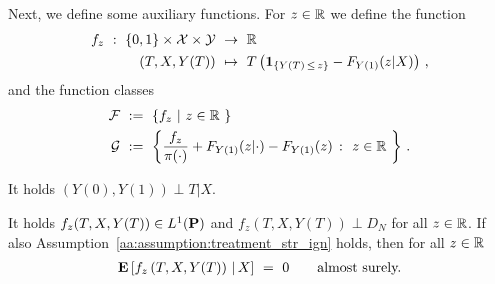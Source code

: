Next, we define some auxiliary functions.
  For $z\in\R$ we define the function
  \begin{align*}
    f_z
    \ 
    :
    \ 
      \left\{ 0,1 \right\}
      \times
      \mathcal{X}
      \times
      \mathcal{Y}
    &
    \ 
    \to
    \ 
    \R
    \\
      (T,X,Y(T))
    &
      \ 
      \mapsto
      \ 
      T
      \left( 
        \mathbf{1}
        _{\left\{  Y(T)\,\le\,z \right\}}
        -
        F_{Y(1)}(z|X)
      \right)
      \,,
  \end{align*}
  and the function classes
  \begin{gather}
    \label{F_g}
    \begin{split}
    \mathcal{F}
    &
    \ 
    :=
    \ 
    \left\{ 
      f_z
      \ 
      |
      \ 
      z\in\R\ 
    \right\}
    \\
    \mathcal{G}
    &
    \ 
    :=
    \ 
    \left\{ 
      \frac{f_z}{\pi(\cdot)}
      +
      F_{Y(1)}(z|\cdot)
      -
      F_{Y(1)}(z)
      \ 
      \colon
      \ 
      z\in\R\ 
    \right\}
    \,.
    \end{split}
  \end{gather}
  \begin{assumption}
    \label{aa:assumption:treatment_str_ign}
    It holds $(Y(0),Y(1))\perp T | X$.
  \end{assumption}
  \begin{lemma}
    \label{aa:mean:r3:lem:fz_E}
    It holds
    $f_z(T,X,Y(T))\in L^1(\P)$
    and 
    $f_z(T,X,Y(T))\perp D_N$
    for all $z\in\R$.
    If also Assumption~\ref{aa:assumption:treatment_str_ign} holds,
    then 
    for all $z\in\R$
    \begin{gather*}
      \E
      \left[
        f_z
        \left( 
          T,
          X,
          Y(T)
        \right)
        \,
        |
        \,
        X
      \right]
      \ 
      =
      \ 
      0
      \qquad
      \text{almost surely.}
    \end{gather*}
  \end{lemma}
